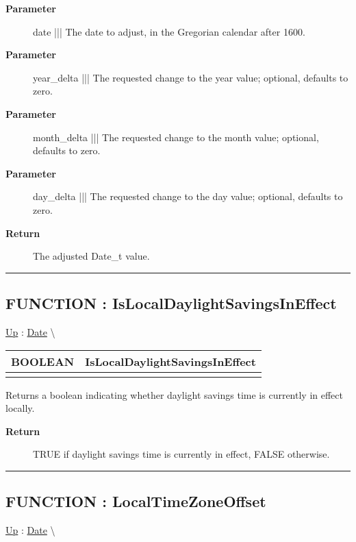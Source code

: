 \par
\begin{description}
\item [\textbf{Parameter}] date ||| The date to adjust, in the Gregorian calendar after 1600.
\item [\textbf{Parameter}] year\_delta ||| The requested change to the year value; optional, defaults to zero.
\item [\textbf{Parameter}] month\_delta ||| The requested change to the month value; optional, defaults to zero.
\item [\textbf{Parameter}] day\_delta ||| The requested change to the day value; optional, defaults to zero.
\item [\textbf{Return}] The adjusted Date\_t value.
\end{description}

\rule{\linewidth}{0.5pt}
\subsection*{FUNCTION : IsLocalDaylightSavingsInEffect}
\hypertarget{ecldoc:date.islocaldaylightsavingsineffect}{}
\hyperlink{ecldoc:Date}{Up} :
\hspace{0pt} \hyperlink{ecldoc:Date}{Date} \textbackslash 

{\renewcommand{\arraystretch}{1.5}
\begin{tabularx}{\textwidth}{|>{\raggedright\arraybackslash}l|X|}
\hline
\hspace{0pt}BOOLEAN & IsLocalDaylightSavingsInEffect \\
\hline
\multicolumn{2}{|>{\raggedright\arraybackslash}X|}{\hspace{0pt}()} \\
\hline
\end{tabularx}
}

\par
Returns a boolean indicating whether daylight savings time is currently in effect locally.

\par
\begin{description}
\item [\textbf{Return}] TRUE if daylight savings time is currently in effect, FALSE otherwise.
\end{description}

\rule{\linewidth}{0.5pt}
\subsection*{FUNCTION : LocalTimeZoneOffset}
\hypertarget{ecldoc:date.localtimezoneoffset}{}
\hyperlink{ecldoc:Date}{Up} :
\hspace{0pt} \hyperlink{ecldoc:Date}{Date} \textbackslash 

